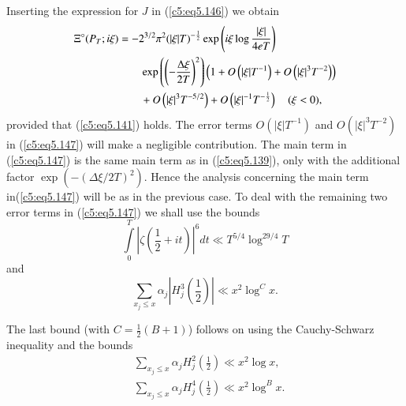 Inserting the expression for $J$ in (\ref{c5:eq5.146}) we obtain
\begin{align}
\Xi^\circ (P_T;i\xi) &  = 
- 2^{3/2} \pi^2 (|\xi|T)^{-\frac{1}{2}} \exp \left(i\xi \log
\frac{|\xi|}{4 eT} \right)\label{c5:eq5.147}\\  
& \qquad \exp \left(\left(-\frac{\Delta \xi}{2T} \right)^2 \right)
\left(1+O\left(|\xi| T^{-1}\right) + O \left(|\xi|^3
T^{-2}\right)\right)\notag\\ 
& \qquad + O\left(|\xi|^3 T^{-{5/2}}\right) +  O \left(|\xi|^{-1}
T^{-\frac{1}{2}}\right) \quad (\xi < 0), \notag
\end{align}
provided that (\ref{c5:eq5.141}) holds. The error terms
$O(|\xi|T^{-1})$ and $O(|\xi|^3 T^{-2})$ in (\ref{c5:eq5.147}) will
make a negligible contribution. The main term in (\ref{c5:eq5.147}) is
the same main term as in (\ref{c5:eq5.139}), only with the additional
factor $\exp (-(\Delta \xi/2T)^2)$. Hence the analysis concerning the
main term in\break (\ref{c5:eq5.147}) will be as in the previous case. To
deal with the remaining two error terms in (\ref{c5:eq5.147}) we shall
use the bounds 
\begin{equation}
\int\limits^T_0 \left|\zeta \left(\frac{1}{2} + it \right)\right|^6 dt
\ll  T^{5/4} \log^{29/4} T \label{c5:eq5.148}
\end{equation}
and
\begin{equation}
\sum\limits_{x_j \leq x} \alpha_j \left|H^3_j \left(\frac{1}{2} \right)\right|
\ll x^2 \log^C x.  \label{c5:eq5.149}
\end{equation}

The last bound (with $C =\frac{1}{2} (B+1)$) follows on using the
Cauchy-Schwarz inequality and the bounds 
\begin{align}
& \sum\limits_{x_j \leq x} \alpha_j H^2_j \left(\frac{1}{2} \right)
  \ll x^2 \log x, \label{c5:eq5.150}\\  
& \sum\limits_{x_j \leq x} \alpha_j H^4_j (\frac{1}{2}) \ll x^2 \log^B
  x.\label{c5:eq5.151} 
\end{align}

